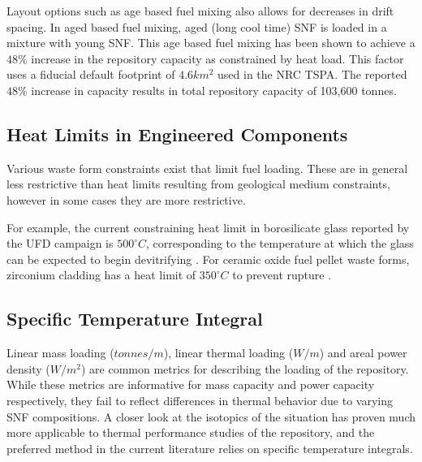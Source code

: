 
Layout options such as age based fuel mixing also allows for decreases in drift 
spacing. In aged based fuel mixing, aged (long cool time) SNF is loaded in a 
mixture with young SNF. This age based fuel mixing has been shown to achieve a 
$48\%$ increase in the repository capacity as constrained by heat
load\cite{nicholson_thermal_2007}. This factor uses a fiducial default
footprint of $4.6 km^2$ used in the NRC TSPA.  The reported $48\%$ increase in
capacity results in total repository capacity of 103,600
tonnes\cite{williams_total_2001}.




\subsection{Heat Limits in Engineered Components} 

Various waste form constraints exist that limit fuel loading. These are 
in general less restrictive than heat limits resulting from geological medium 
constraints, however in some cases they are more restrictive. 

For example, the current constraining heat limit in borosilicate glass 
reported by the \gls{UFD} campaign is $500^{\circ}C$, corresponding to the 
temperature at which the glass can be expected to begin devitrifying 
\cite{carter_disposal_2010, hardin_generic_2011, soelberg_heat_2009}. For ceramic oxide 
fuel pellet waste forms, zirconium cladding has a heat limit of $350^{\circ}C$ 
to prevent rupture \cite{soelberg_heat_2009}.

\subsection{Specific Temperature Integral}

Linear mass loading ($tonnes/m$), linear thermal loading ($W/m$) and areal power 
density ($W/m^2$) are common metrics
for describing the loading of the repository. While these metrics are
informative for mass capacity and power capacity respectively, they fail to
reflect differences in thermal behavior due to varying SNF compositions.  A
closer look at the isotopics of the situation has proven much more applicable
to thermal performance studies of the repository, and the preferred method in
the current literature relies on specific temperature integrals.


